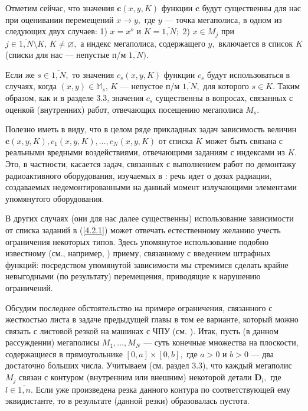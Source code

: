 \documentclass[11pt,twoside,openany]{report}
\newcommand{\ov}{\overline}
\newcommand{\sm}{\setminus}
\newcommand{\bbm}{{\mathbb M}}
\newcommand{\emp}{\varnothing}
\begin{document}
{Отметим сейчас, что значения $\mathbf{c}(x,y,K)$ функции $\mathbf{c}$ будут
существенны для нас при оценивании перемещений $x\rightarrow y,$ где $y$ ---
точка мегаполиса, в одном из следующих двух случаев: 1) $x= x^o$ и $K =
\ov{1,N};$ 2) $x\in M_j$ при $j\in \ov{1,N}\sm K,\, K\neq \emp,$ а индекс
мегаполиса, содержащего $y,$ включается в список $K$ (списки для нас ---
непустые п/м $\ov{1,N}).$

Если же $s\in \ov{1,N},$ то значения $c_s(x,y,K)$ функции $c_s$ будут
использоваться в случаях, когда $(x,y)\in \bbm_s,\, K$ --- непустое п/м
$\ov{1,N},$ для которого $s\in K.$ Таким образом, как и в разделе 3.3,
значения $c_s$ существенны в вопросах, связанных с оценкой (внутренних)
работ, отвечающих посещению мегаполиса $M_s.$

Полезно иметь в виду, что в целом ряде прикладных задач зависимость
величин $\mathbf{c}(x,y,K), c_1(x,y,K),\ldots,c_N(x,y,K)$ от списка $K$
может быть связана с реальными вредными воздействиями, отвечающими заданиям
с индексами из $K.$ Это, в частности, касается задач, связанных с выполнением
работ по демонтажу радиоактивного оборудования, изучаемых в \cite{Cha2`}:
речь идет о дозах радиации, создаваемых недемонтированными на данный момент
излучающими элементами упомянутого оборудования.

В других случаях (они для нас далее существенны) использование зависимости
от списка заданий в (\ref{4.2.1}) может отвечать естественному желанию учесть
ограничения некоторых типов. Здесь упомянутое использование подобно известному
(см., например, \cite[c.~202--205]{Cha9`}) приему, связанному с введением
штрафных функций: посредством упомянутой зависимости мы стремимся сделать
крайне невыгодными  (по результату) перемещения, приводящие к нарушению
ограничений.

Обсудим последнее обстоятельство на примере ограничения, связанного с
жесткостью листа в задаче предыдущей главы в том ее варианте, который можно
связать с листовой резкой на машинах с ЧПУ (см. \cite{Cha10`}). Итак, пусть
(в данном рассуждении) мегаполисы $M_1,\ldots,M_N$ --- суть конечные
множества на плоскости, содержащиеся в прямоугольнике $[0,a] \times
[0,b],$ где $a > 0$ и $b> 0$ --- два достаточно больших числа. Учитываем
(см. раздел 3.3), что   каждый мегаполис $M_j$ связан с контуром
(внутренним или внешним) некоторой детали $\mathbf{D}_l,$ где $l\in
\ov{1,n}.$ Если уже произведена резка данного контура по соответствующей
ему эквидистанте, то в результате (данной резки) образовалась пустота.

}
\end{document}
